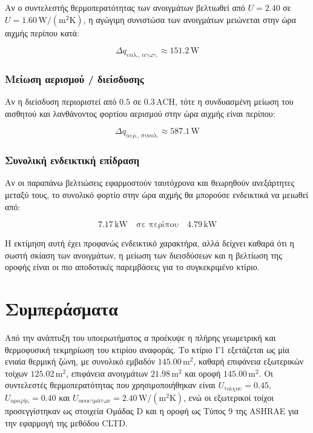 \documentclass[12pt,a4paper]{article}
\begin{document}
Αν ο συντελεστής θερμοπερατότητας των ανοιγμάτων βελτιωθεί από
\(U = 2.40\) σε \(U = 1.60\,\mathrm{W/(m^2K)}\), η αγώγιμη συνιστώσα των ανοιγμάτων
μειώνεται στην ώρα αιχμής περίπου κατά:

\[
\Delta q_{\text{υαλ., αγωγ.}} \approx 151.2\,\mathrm{W}
\]

\subsubsection{Μείωση αερισμού / διείσδυσης}

Αν η διείσδυση περιοριστεί από \(0.5\) σε \(0.3\,\mathrm{ACH}\), τότε η συνδυασμένη
μείωση του αισθητού και λανθάνοντος φορτίου αερισμού στην ώρα αιχμής είναι περίπου:

\[
\Delta q_{\text{αερ., συνολ.}} \approx 587.1\,\mathrm{W}
\]

\subsubsection{Συνολική ενδεικτική επίδραση}

Αν οι παραπάνω βελτιώσεις εφαρμοστούν ταυτόχρονα και θεωρηθούν ανεξάρτητες μεταξύ τους,
το συνολικό φορτίο στην ώρα αιχμής θα μπορούσε ενδεικτικά να μειωθεί από:

\[
7.17\,\mathrm{kW}
\quad \text{σε περίπου} \quad
4.79\,\mathrm{kW}
\]

Η εκτίμηση αυτή έχει προφανώς ενδεικτικό χαρακτήρα, αλλά δείχνει καθαρά ότι η σωστή
σκίαση των ανοιγμάτων, η μείωση των διεισδύσεων και η βελτίωση της οροφής είναι οι
πιο αποδοτικές παρεμβάσεις για το συγκεκριμένο κτίριο.

\section{Συμπεράσματα}

Από την ανάπτυξη του υποερωτήματος α προέκυψε η πλήρης γεωμετρική και
θερμοφυσική τεκμηρίωση του κτιρίου αναφοράς. Το κτίριο Γ1 εξετάζεται ως μία ενιαία
θερμική ζώνη, με συνολικό εμβαδόν \(145.00\,\mathrm{m^2}\), καθαρή επιφάνεια
εξωτερικών τοίχων \(125.02\,\mathrm{m^2}\), επιφάνεια ανοιγμάτων
\(21.98\,\mathrm{m^2}\) και οροφή \(145.00\,\mathrm{m^2}\). Οι συντελεστές
θερμοπερατότητας που χρησιμοποιήθηκαν είναι \(U_{\text{τοίχου}}=0.45\),
\(U_{\text{οροφής}}=0.40\) και \(U_{\text{ανοιγμάτων}}=2.40\,\mathrm{W/(m^2K)}\),
ενώ οι εξωτερικοί τοίχοι προσεγγίστηκαν ως στοιχεία Ομάδας D και η οροφή ως
Τύπος 9 της ASHRAE για την εφαρμογή της μεθόδου CLTD.
\end{document}
